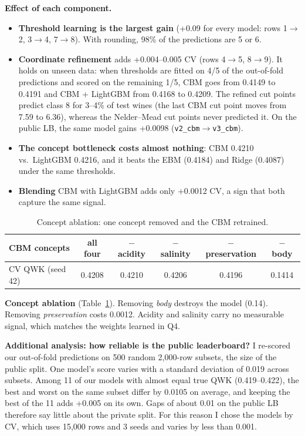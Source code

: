 \documentclass[10pt,a4paper]{article}
\newcommand{\sub}[1]{\par\vspace{2pt}\textbf{\color{navy}#1}\quad}
\begin{document}
\sub{Effect of each component.}
\begin{itemize}
\item \textbf{Threshold learning is the largest gain} (+0.09 for every model: rows 1$\to$2, 3$\to$4, 7$\to$8). With rounding, 98\% of the predictions are 5 or 6.
\item \textbf{Coordinate refinement} adds +0.004--0.005 CV (rows 4$\to$5, 8$\to$9). It holds on unseen data: when thresholds are fitted on 4/5 of the out-of-fold predictions and scored on the remaining 1/5, CBM goes from 0.4149 to 0.4191 and CBM + LightGBM from 0.4168 to 0.4209. The refined cut points predict class 8 for 3--4\% of test wines (the last CBM cut point moves from 7.59 to 6.36), whereas the Nelder--Mead cut points never predicted it. On the public LB, the same model gains +0.0098 (\texttt{v2\_cbm}$\to$\texttt{v3\_cbm}).
\item \textbf{The concept bottleneck costs almost nothing}: CBM 0.4210 vs.\ LightGBM 0.4216, and it beats the EBM (0.4184) and Ridge (0.4087) under the same thresholds.
\item \textbf{Blending} CBM with LightGBM adds only +0.0012 CV, a sign that both capture the same signal.
\end{itemize}

\begin{table}[h]\centering\small
\begin{tabular}{@{}lccccc@{}}\toprule
CBM concepts & all four & $-$ acidity & $-$ salinity & $-$ preservation & $-$ body \\\midrule
CV QWK (seed 42) & 0.4208 & 0.4210 & 0.4206 & 0.4196 & 0.1414 \\\bottomrule
\end{tabular}
\caption{Concept ablation: one concept removed and the CBM retrained.}\label{tab:cpt}
\end{table}
\vspace{-4pt}
\textbf{Concept ablation} (Table~\ref{tab:cpt}). Removing \emph{body} destroys the model (0.14). Removing \emph{preservation} costs 0.0012. Acidity and salinity carry no measurable signal, which matches the weights learned in Q4.

\sub{Additional analysis: how reliable is the public leaderboard?} I re-scored our out-of-fold predictions on 500 random 2{,}000-row subsets, the size of the public split. One model's score varies with a standard deviation of 0.019 across subsets. Among 11 of our models with almost equal true QWK (0.419--0.422), the best and worst on the same subset differ by 0.0105 on average, and keeping the best of the 11 adds +0.005 on its own. Gaps of about 0.01 on the public LB therefore say little about the private split. For this reason I chose the models by CV, which uses 15{,}000 rows and 3 seeds and varies by less than 0.001.
\end{document}
